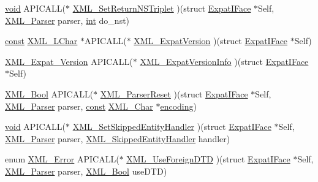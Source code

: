 \begin{DoxyCompactItemize}
\item 
\hyperlink{sound_8c_ae35f5844602719cf66324f4de2a658b3}{void} A\+P\+I\+C\+A\+LL($\ast$ \hyperlink{struct_expat_i_face_a5f9201e00690cc5cbb2087f489e75da2}{X\+M\+L\+\_\+\+Set\+Return\+N\+S\+Triplet} )(struct \hyperlink{struct_expat_i_face}{Expat\+I\+Face} $\ast$Self, \hyperlink{amiga_2include_2libraries_2expat_8h_a9dc0003156857c67b3a60b3993846013}{X\+M\+L\+\_\+\+Parser} parser, \hyperlink{xmltok_8h_a5a0d4a5641ce434f1d23533f2b2e6653}{int} do\+\_\+nst)
\item 
\hyperlink{getopt1_8c_a2c212835823e3c54a8ab6d95c652660e}{const} \hyperlink{amiga_2include_2libraries_2expat_8h_a728c9a3114531eaeb70753ba4601c418}{X\+M\+L\+\_\+\+L\+Char} $\ast$A\+P\+I\+C\+A\+LL($\ast$ \hyperlink{struct_expat_i_face_a768efefce7ca6fb95d8461e82aa42ad5}{X\+M\+L\+\_\+\+Expat\+Version} )(struct \hyperlink{struct_expat_i_face}{Expat\+I\+Face} $\ast$Self)
\item 
\hyperlink{struct_x_m_l___expat___version}{X\+M\+L\+\_\+\+Expat\+\_\+\+Version} A\+P\+I\+C\+A\+LL($\ast$ \hyperlink{struct_expat_i_face_ad257fe2441ac77033255c6af38ad31c9}{X\+M\+L\+\_\+\+Expat\+Version\+Info} )(struct \hyperlink{struct_expat_i_face}{Expat\+I\+Face} $\ast$Self)
\item 
\hyperlink{amiga_2include_2libraries_2expat_8h_a5fe41bca8b7a23b2405f1b967e70f33a}{X\+M\+L\+\_\+\+Bool} A\+P\+I\+C\+A\+LL($\ast$ \hyperlink{struct_expat_i_face_a8ef1db8d07e66d6c4a627052b8d8c840}{X\+M\+L\+\_\+\+Parser\+Reset} )(struct \hyperlink{struct_expat_i_face}{Expat\+I\+Face} $\ast$Self, \hyperlink{amiga_2include_2libraries_2expat_8h_a9dc0003156857c67b3a60b3993846013}{X\+M\+L\+\_\+\+Parser} parser, \hyperlink{getopt1_8c_a2c212835823e3c54a8ab6d95c652660e}{const} \hyperlink{amiga_2include_2libraries_2expat_8h_a63da96463e775e1ec3a7d1f076208127}{X\+M\+L\+\_\+\+Char} $\ast$\hyperlink{structencoding}{encoding})
\item 
\hyperlink{sound_8c_ae35f5844602719cf66324f4de2a658b3}{void} A\+P\+I\+C\+A\+LL($\ast$ \hyperlink{struct_expat_i_face_aefa7c71aeed20fb479302862394ccbce}{X\+M\+L\+\_\+\+Set\+Skipped\+Entity\+Handler} )(struct \hyperlink{struct_expat_i_face}{Expat\+I\+Face} $\ast$Self, \hyperlink{amiga_2include_2libraries_2expat_8h_a9dc0003156857c67b3a60b3993846013}{X\+M\+L\+\_\+\+Parser} parser, \hyperlink{amiga_2include_2libraries_2expat_8h_ab88af945eaab479fcd1af46a350fdaea}{X\+M\+L\+\_\+\+Skipped\+Entity\+Handler} handler)
\item 
enum \hyperlink{amiga_2include_2libraries_2expat_8h_a6a06dad2fbbc37dd288c51e577494118}{X\+M\+L\+\_\+\+Error} A\+P\+I\+C\+A\+LL($\ast$ \hyperlink{struct_expat_i_face_a3b2b7f000d7250ac97ebd5075e5d6c53}{X\+M\+L\+\_\+\+Use\+Foreign\+D\+TD} )(struct \hyperlink{struct_expat_i_face}{Expat\+I\+Face} $\ast$Self, \hyperlink{amiga_2include_2libraries_2expat_8h_a9dc0003156857c67b3a60b3993846013}{X\+M\+L\+\_\+\+Parser} parser, \hyperlink{amiga_2include_2libraries_2expat_8h_a5fe41bca8b7a23b2405f1b967e70f33a}{X\+M\+L\+\_\+\+Bool} use\+D\+TD)

\end{DoxyCompactItemize}
